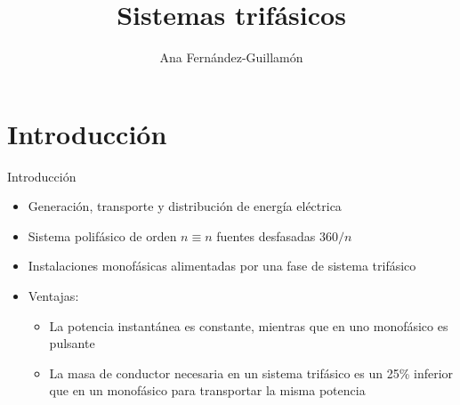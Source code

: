 \documentclass[aspectratio=169, xcolor={usenames,svgnames,dvipsnames}]{beamer}
\author{Ana Fernández-Guillamón}
\date{}
\title{Sistemas trifásicos}
\begin{document}
\maketitle

\section{Introducción}

\begin{frame}{Introducción}
\begin{itemize}
\item Generación, transporte y distribución de energía eléctrica
\item Sistema polifásico de orden $n\equiv n$ fuentes desfasadas $360/n$
\item Instalaciones monofásicas alimentadas por una fase de sistema trifásico
\item Ventajas:
\begin{itemize}
    \item La potencia instantánea es constante, mientras que en uno monofásico es pulsante
    \item La masa de conductor necesaria en un sistema trifásico es un 25\% inferior que en un monofásico para transportar la misma potencia 
\end{itemize}
\end{itemize}
\end{frame}
\end{document}
